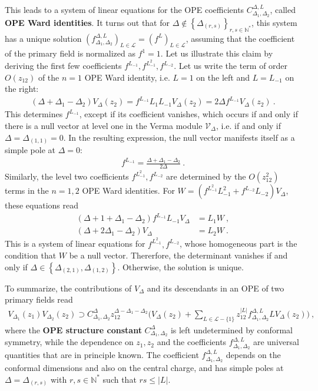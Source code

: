 \documentclass[12pt, a4paper]{article}
\theoremstyle{break}
\begin{document}
This leads to a system of linear equations for the OPE coefficients $C^{\Delta,L}_{\Delta_1,\Delta_2}$, called \textbf{OPE Ward identities}. It turns out that for $\Delta\notin \left\{\Delta_{(r,s)}\right\}_{r,s\in\mathbb{N}^*}$, this system has a unique solution $\left(f^{\Delta,L}_{\Delta_1,\Delta_2}\right)_{L\in\mathcal{L}}=\left(f^L\right)_{L\in\mathcal{L}}$, assuming that the coefficient of the primary field is normalized as
$f^{1}=1$. Let us illustrate this claim by deriving the first few coefficients $f^{L_{-1}},f^{L_{-1}^2},f^{L_{-2}}$. Let us write the term of order $O(z_{12})$ of the $n=1$ OPE Ward identity, i.e. $L=1$ on the left and $L=L_{-1}$ on the right:
\begin{align}
 (\Delta+\Delta_1-\Delta_2)V_\Delta(z_2) = f^{L_{-1}} L_1L_{-1}V_\Delta(z_2)=2\Delta f^{L_{-1}}V_\Delta(z_2)\ .
 \label{dddv}
\end{align}
This determines $f^{L_{-1}}$, except if its coefficient vanishes, which occurs if and only if there is a null vector at level one in the Verma module $\mathcal{V}_\Delta$, i.e. if and only if $\Delta=\Delta_{(1,1)}=0$. In the resulting expression, the null vector manifests itself as a simple pole at $\Delta=0$:
\begin{align}
 f^{L_{-1}} = \frac{\Delta+\Delta_1-\Delta_2}{2\Delta}\ . 
 \label{fl1}
\end{align}
Similarly, the level two coefficients $f^{L_{-1}^2},f^{L_{-2}}$ are determined by the $O(z_{12}^2)$ terms in the $n=1,2$ OPE Ward identities. For $W = \left(f^{L_{-1}^2}L_{-1}^2 + f^{L_{-2}}L_{-2}\right) V_\Delta$, these equations read 
\begin{align}
 (\Delta+1+\Delta_1-\Delta_2)f^{L_{-1}}L_{-1}V_\Delta  &= L_1W\ ,
 \label{el1c}
 \\
 (\Delta+2\Delta_1-\Delta_2)V_\Delta  &=L_2W \ .
 \label{el2c}
\end{align}
This is a system of linear equations for $f^{L_{-1}^2},f^{L_{-2}}$, whose homogeneous part is the condition that $W$ be a null vector. Thererfore, the determinant vanishes if and only if $\Delta\in \left\{\Delta_{(2,1)},\Delta_{(1,2)}\right\}$. Otherwise, the solution is unique. 

To summarize, the contributions of $V_\Delta$ and its descendants in an OPE of two primary fields read
\begin{align}
 \boxed{V_{\Delta_1}(z_1)V_{\Delta_2}(z_2) \supset  C_{\Delta_1,\Delta_2}^{\Delta} z_{12}^{\Delta-\Delta_1-\Delta_2} \Bigg(V_\Delta(z_2) +\sum_{L\in \mathcal{L}-\{1\}}z_{12}^{|L|} f^{\Delta,L}_{\Delta_1,\Delta_2} LV_\Delta(z_2)\Bigg)}
 \ ,
 \label{prope}
\end{align}
where the \textbf{OPE structure constant} $C^\Delta_{\Delta_1,\Delta_2}$ is left undetermined by conformal symmetry, while the dependence on $z_1,z_2$ and the coefficients $f^{\Delta,L}_{\Delta_1,\Delta_2}$ are universal quantities that are in principle known. The coefficient $f^{\Delta,L}_{\Delta_1,\Delta_2}$ depends on the conformal dimensions and also on the central charge, and has simple poles at $\Delta=\Delta_{(r,s)}$ with $r,s\in\mathbb{N}^*$ such that $rs\leq |L|$. 
\end{document}
